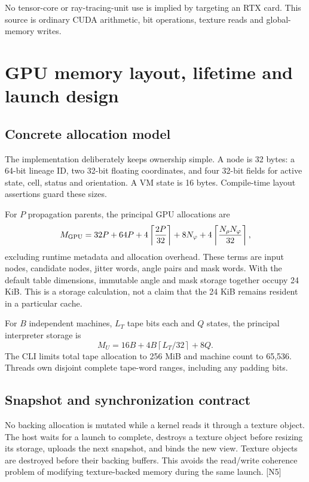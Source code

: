 \documentclass[11pt,a4paper]{article}
\newcommand{\ext}[1]{\textcolor{muted}{[N#1]}}
\newcommand{\ph}{\varphi}
\begin{document}
No tensor-core or ray-tracing-unit use is implied by targeting an RTX card. This source is ordinary CUDA arithmetic, bit operations, texture reads and global-memory writes.
\clearpage

\section{GPU memory layout, lifetime and launch design}
\subsection{Concrete allocation model}
The implementation deliberately keeps ownership simple. A node is 32 bytes: a 64-bit lineage ID, two 32-bit floating coordinates, and four 32-bit fields for active state, cell, status and orientation. A VM state is 16 bytes. Compile-time layout assertions guard these sizes.

For $P$ propagation parents, the principal GPU allocations are
\begin{equation}
 M_{\rm GPU}=32P+64P+4\left\lceil\frac{2P}{32}\right\rceil
 +8N_\ph+4\left\lceil\frac{N_\rho N_\ph}{32}\right\rceil,
\end{equation}
excluding runtime metadata and allocation overhead. These terms are input nodes, candidate nodes, jitter words, angle pairs and mask words. With the default table dimensions, immutable angle and mask storage together occupy 24 KiB. This is a storage calculation, not a claim that the 24 KiB remains resident in a particular cache.

For $B$ independent machines, $L_T$ tape bits each and $Q$ states, the principal interpreter storage is
\begin{equation}
 M_U=16B+4B\left\lceil L_T/32\right\rceil+8Q.
\end{equation}
The CLI limits total tape allocation to 256 MiB and machine count to 65,536. Threads own disjoint complete tape-word ranges, including any padding bits.

\subsection{Snapshot and synchronization contract}
No backing allocation is mutated while a kernel reads it through a texture object. The host waits for a launch to complete, destroys a texture object before resizing its storage, uploads the next snapshot, and binds the new view. Texture objects are destroyed before their backing buffers. This avoids the read/write coherence problem of modifying texture-backed memory during the same launch. \ext{5}
\end{document}
